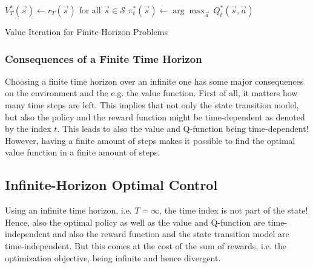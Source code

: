 				\begin{algorithm}  \DontPrintSemicolon
					\( V_T^\ast(\vec{s}) \gets r_T(\vec{s}) \) for all \( \vec{s} \in \mathcal{S} \) \;
					\Return \( \pi_t^\ast(\vec{s}) \gets \arg\max_{\vec{a}} \, Q_t^\ast(\vec{s}, \vec{a}) \)  \label{algline:valueIterationFiniteHorizon-piComputation} \;

					\caption{Value Iteration for Finite-Horizon Problems}
					\label{alg:valueIterationFiniteHorizon}
				\end{algorithm}

			\subsubsection{Consequences of a Finite Time Horizon}
				Choosing a finite time horizon over an infinite one has some major consequences on the environment and the e.g. the value function. First of all, it matters how many time steps are left. This implies that not only the state transition model, but also the policy and the reward function might be time-dependent as denoted by the index \(t\). This leads to also the value and Q-function being time-dependent! However, having a finite amount of steps makes it possible to find the optimal value function in a finite amount of steps.

		\subsection{Infinite-Horizon Optimal Control} %
			Using an infinite time horizon, i.e. \( T = \infty \), the time index is not part of the state! Hence, also the optimal policy as well as the value and Q-function are time-independent and also the reward function and the state transition model are time-independent. But this comes at the cost of the sum of rewards, i.e. the optimization objective, being infinite and hence divergent.

